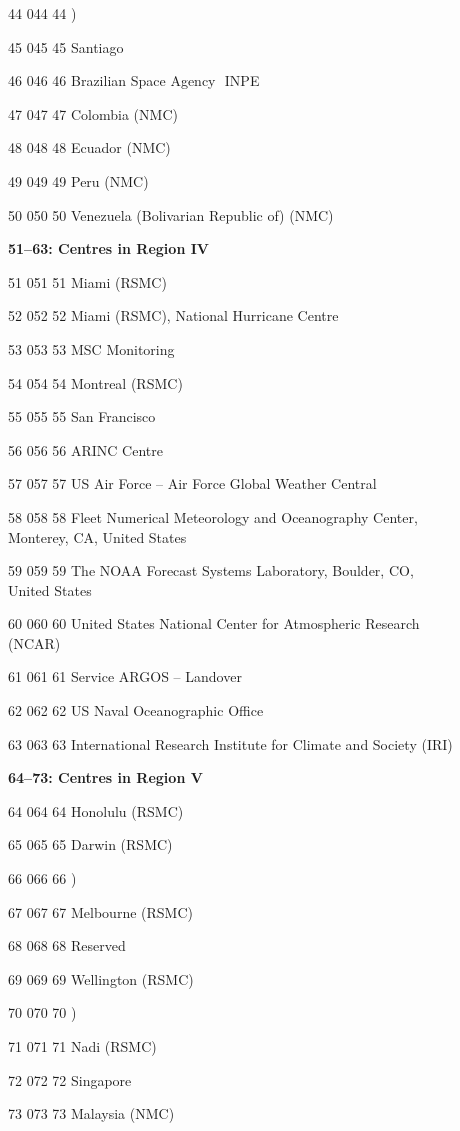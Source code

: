 44 044 44 )

45 045 45 Santiago

46 046 46 Brazilian Space Agency ­ INPE

47 047 47 Colombia (NMC)

48 048 48 Ecuador (NMC)

49 049 49 Peru (NMC)

50 050 50 Venezuela (Bolivarian Republic of) (NMC)

\textbf{51--63: Centres in Region IV}

51 051 51 Miami (RSMC)

52 052 52 Miami (RSMC), National Hurricane Centre

53 053 53 MSC Monitoring

54 054 54 Montreal (RSMC)

55 055 55 San Francisco

56 056 56 ARINC Centre

57 057 57 US Air Force -- Air Force Global Weather Central

58 058 58 Fleet Numerical Meteorology and Oceanography Center,\\
Monterey, CA, United States

59 059 59 The NOAA Forecast Systems Laboratory, Boulder, CO,\\
United States

60 060 60 United States National Center for Atmospheric Research\\
(NCAR)

61 061 61 Service ARGOS -- Landover

62 062 62 US Naval Oceanographic Office

63 063 63 International Research Institute for Climate and Society (IRI)

\textbf{64--73: Centres in Region V}

64 064 64 Honolulu (RSMC)

65 065 65 Darwin (RSMC)

66 066 66 )

67 067 67 Melbourne (RSMC)

68 068 68 Reserved

69 069 69 Wellington (RSMC)

70 070 70 )

71 071 71 Nadi (RSMC)

72 072 72 Singapore

73 073 73 Malaysia (NMC)

\emph{\\
}

